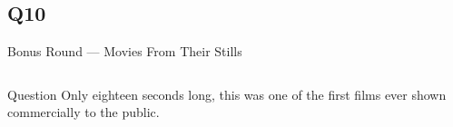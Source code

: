 \documentclass[11pt]{beamer}
\begin{document}
\subsection*{Q10}
\begin{frame}[t]{Bonus Round --- Movies From Their Stills}
    \vspace{-0.5em}
    \begin{columns}[T,totalwidth=\linewidth]
        \begin{column}{0.32\linewidth}
            \begin{block}{Question}
                Only eighteen seconds long, this was one of the first films ever shown commercially to the public.
            \end{block}
        \end{column}
        \begin{column}{0.65\linewidth}
            \begin{center}
                \texttt{[image: \{Images/thekiss]}.jpg}
            \end{center}
        \end{column}
    \end{columns}
\end{frame}
\end{document}
